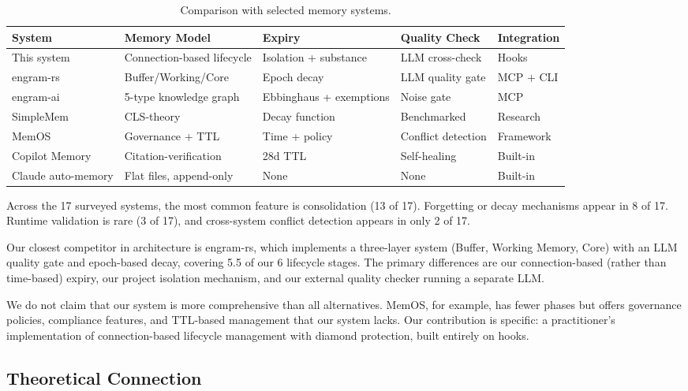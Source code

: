 \documentclass[11pt,a4paper]{article}
\begin{document}
\begin{table}[H]
\centering
\caption{Comparison with selected memory systems.}
\label{tab:comparison}
\small
\begin{tabularx}{\textwidth}{lXlll}
\toprule
\textbf{System} & \textbf{Memory Model} & \textbf{Expiry} & \textbf{Quality Check} & \textbf{Integration} \\
\midrule
This system & Connection-based lifecycle & Isolation + substance & LLM cross-check & Hooks \\
engram-rs~\cite{engramrs} & Buffer/Working/Core & Epoch decay & LLM quality gate & MCP + CLI \\
engram-ai~\cite{engramai} & 5-type knowledge graph & Ebbinghaus + exemptions & Noise gate & MCP \\
SimpleMem~\cite{simplemem} & CLS-theory & Decay function & Benchmarked & Research \\
MemOS~\cite{memospaper} & Governance + TTL & Time + policy & Conflict detection & Framework \\
Copilot Memory & Citation-verification & 28d TTL & Self-healing & Built-in \\
Claude auto-memory & Flat files, append-only & None & None & Built-in \\
\bottomrule
\end{tabularx}
\end{table}

Across the 17 surveyed systems, the most common feature is consolidation (13 of 17).
Forgetting or decay mechanisms appear in 8 of 17.
Runtime validation is rare (3 of 17), and cross-system conflict detection appears in only 2 of 17.

Our closest competitor in architecture is engram-rs, which implements a three-layer system (Buffer, Working Memory, Core) with an LLM quality gate and epoch-based decay, covering 5.5 of our 6 lifecycle stages.
The primary differences are our connection-based (rather than time-based) expiry, our project isolation mechanism, and our external quality checker running a separate LLM.

We do not claim that our system is more comprehensive than all alternatives.
MemOS, for example, has fewer phases but offers governance policies, compliance features, and TTL-based management that our system lacks.
Our contribution is specific: a practitioner's implementation of connection-based lifecycle management with diamond protection, built entirely on hooks.


\subsection{Theoretical Connection}
\end{document}
